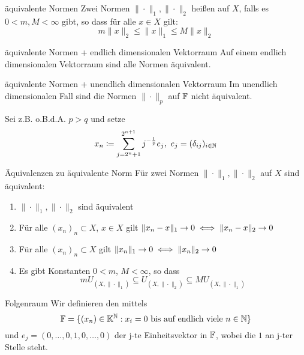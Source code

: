 	\begin{karte}{äquivalente Normen}
		Zwei Normen $\| \cdot \|_{1}, \| \cdot \|_{2}$ hei{\ss}en  auf $X$, falls es $0 < m, M < \infty$ gibt, so dass für alle $ x \in X$ gilt:
		\[ m \| x \|_{2} \leq \| x \|_{1} \leq M \| x \|_{2} \]
	\end{karte}
	
	\begin{karte}{äquivalente Normen + endlich dimensionalen Vektorraum}
		Auf einem endlich dimensionalen Vektorraum sind alle Normen äquivalent.
	\end{karte}
	
	\begin{karte}{äquivalente Normen + unendlich dimensionalen Vektorraum}
		Im unendlich dimensionalen Fall sind die Normen $\| \cdot \|_{p}$ auf $\mathbb{F}$ nicht äquivalent.
	
		Sei z.B. o.B.d.A. $p > q$ und setze 
		\[ x_{n} \coloneqq \sum_{j = 2^{n} + 1}^{2^{n + 1}} j^{-\frac{1}{p}}e_{j}, ~ e_{j} = ( \delta_{ij} )_{i \in \mathbb{N}} \]
	\end{karte}
	
	\begin{karte}{Äquivalenzen zu äquivalente Norm}
		Für zwei Normen $\| \cdot \|_{1}, \| \cdot \|_{2}$ auf $X$ sind äquivalent:
		\begin{enumerate}[label=\alph*\upshape)]
			\item $\| \cdot \|_{1}, \| \cdot \|_{2}$ sind äquivalent
			\item Für alle $(x_{n})_{n} \subset X$, $x \in X$ gilt $ \| x_{n} - x \|_{1} \rightarrow 0 \iff \| x_{n} - x \|_{2} \rightarrow 0 $
			\item Für alle $(x_{n})_{n} \subset X$ gilt $\| x_{n} \|_{1} \rightarrow 0 \iff \| x_{n} \|_{2} \rightarrow 0 $
			\item Es gibt Konstanten $0 < m$, $M < \infty$, so dass 
				\[ m U_{(X, \| \cdot \|_{1})} \subseteq U_{(X, \| \cdot \|_{2})} \subseteq M U_{(X, \| \cdot \|_{1})} \]
		\end{enumerate}
	\end{karte}
	
	\begin{karte}{Folgenraum}
		Wir definieren den  mittels	
		\[ \mathbb{F} = \{ (x_{n}) \in \mathbb{K}^{\mathbb{N}}: x_{i} = 0 \text{ bis auf endlich viele } n \in \mathbb{N} \} \]
		  und $e_{j} = (0, \dotsc, 0, 1, 0, \dotsc, 0) $ der j-te Einheitsvektor in $\mathbb{F}$, wobei die $1$ an j-ter Stelle steht.
	\end{karte}		

